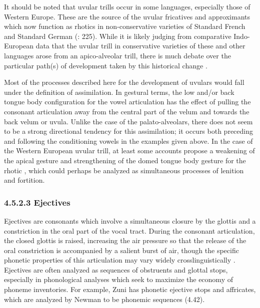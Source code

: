   It should be noted that uvular trills occur in some languages, especially those of Western Europe. These are the source of the uvular fricatives and approximants which now function as rhotics in non-conservative varieties of Standard French and Standard German (\citealt{LadefogedMaddieson1996}: 225). While it is likely judging from comparative Indo-European data that the uvular trill in conservative varieties of these and other languages arose from an apico-alveolar trill, there is much debate over the particular path(s) of development taken by this historical change \citep{Schiller1999}.



  Most of the processes described here for the development of uvulars would fall under the definition of assimilation. In gestural terms, the low and/or back tongue body configuration for the vowel articulation has the effect of pulling the consonant articulation away from the central part of the velum and towards the back velum or uvula. Unlike the case of the palato-alveolars, there does not seem to be a strong directional tendency for this assimilation; it occurs both preceding and following the conditioning vowels in the examples given above. In the case of the Western European uvular trill, at least some accounts propose a weakening of the apical gesture and strengthening of the domed tongue body gesture for the rhotic \citep{Schiller1999}, which could perhaps be analyzed as simultaneous processes of lenition and fortition.


\subsubsection{\rmfamily\bfseries} 
\subsubsection{\textbf{4.5.2.3} \textbf{Ejectives} }

  Ejectives are consonants which involve a simultaneous closure by the glottis and a constriction in the oral part of the vocal tract. During the consonant articulation, the closed glottis is raised, increasing the air pressure so that the release of the oral constriction is accompanied by a salient burst of air, though the specific phonetic properties of this articulation may vary widely crosslinguistically \citep{Lindau1984}. Ejectives are often analyzed as sequences of obstruents and glottal stops, especially in phonological analyses which seek to maximize the economy of phoneme inventories. For example, Zuni has phonetic ejective stops and affricates, which are analyzed by Newman to be phonemic sequences (4.42).



